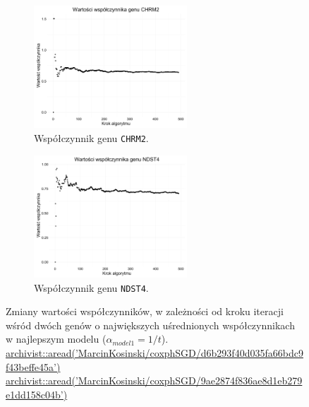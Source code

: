 \begin{figure}[hbt!]
  \begin{center}
   \begin{subfigure}[h!]{0.45\textwidth}
      \includegraphics[width=\textwidth, height=130pt]{Obrazki/analiza/fig6.pdf}
      \caption{Współczynnik genu \texttt{CHRM2}.}
   \end{subfigure}     
   \begin{subfigure}[h!]{0.45\textwidth}
      \includegraphics[width=\textwidth, height=130pt]{Obrazki/analiza/fig7.pdf}
            \caption{Współczynnik genu \texttt{NDST4}.}
   \end{subfigure}  
      \end{center}
  \caption{\label{trajAnalisis} Zmiany wartości współczynników, w zależności od kroku iteracji wśród dwóch genów o największych uśrednionych współczynnikach w najlepszym modelu ($\alpha_{model1} = 1/t$). \\
  \href{https://github.com/MarcinKosinski/coxphSGD/blob/master/gallery/d6b293f40d035fa66bdc9f43beffe45a.rda?raw=true}{archivist::aread('MarcinKosinski/coxphSGD/d6b293f40d035fa66bdc9f43beffe45a')} \\
  \href{https://github.com/MarcinKosinski/coxphSGD/blob/master/gallery/9ae2874f836ae8d1eb279e1dd158c04b.rda?raw=true}{archivist::aread('MarcinKosinski/coxphSGD/9ae2874f836ae8d1eb279e1dd158c04b')}}
\end{figure}
 
